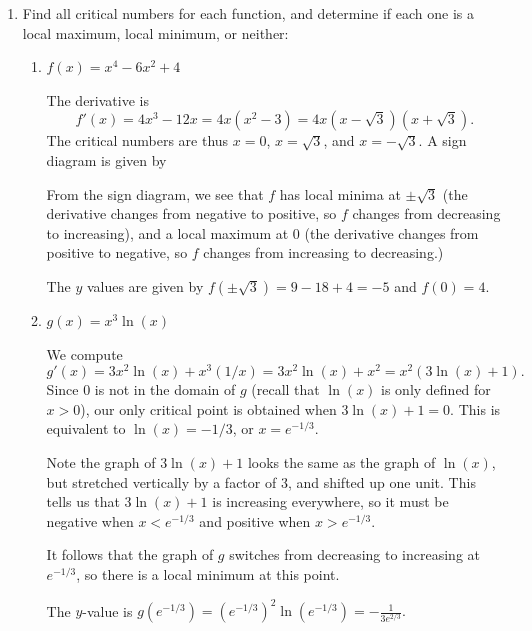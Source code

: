 \documentclass[12pt]{article}
\begin{document}
\begin{enumerate}
\item Find all critical numbers for each function, and determine if each one is a local maximum, local minimum, or neither:
\begin{enumerate}
\item $f(x)=x^4-6x^2+4$

The derivative is
\[
f'(x) = 4x^3-12x=4x(x^2-3)=4x(x-\sqrt{3})(x+\sqrt{3}).
\]
The critical numbers are thus $x=0$, $x=\sqrt{3}$, and $x=-\sqrt{3}$. A sign diagram is given by
\begin{center}
\end{center}
From the sign diagram, we see that $f$ has local minima at $\pm \sqrt{3}$ (the derivative changes from negative to positive, so $f$ changes from decreasing to increasing), and a local maximum at 0 (the derivative changes from positive to negative, so $f$ changes from increasing to decreasing.)

The $y$ values are given by $f(\pm\sqrt{3}) = 9-18+4=-5$ and $f(0)=4$.

\item $g(x) = x^3\ln(x)$

We compute
\[
g'(x) = 3x^2\ln(x)+x^3(1/x) = 3x^2\ln(x)+x^2=x^2(3\ln(x)+1).
\]
Since 0 is not in the domain of $g$ (recall that $\ln(x)$ is only defined for $x>0$), our only critical point is obtained when $3\ln(x)+1=0$. This is equivalent to $\ln(x)=-1/3$, or $x=e^{-1/3}$.

Note the graph of $3\ln(x)+1$ looks the same as the graph of $\ln(x)$, but stretched vertically by a factor of 3, and shifted up one unit. This tells us that $3\ln(x)+1$ is increasing everywhere, so it must be negative when $x<e^{-1/3}$  and positive when $x>e^{-1/3}$.

It follows that the graph of $g$ switches from decreasing to increasing at $e^{-1/3}$, so there is a local minimum at this point.

The $y$-value is $g(e^{-1/3}) = (e^{-1/3})^2\ln(e^{-1/3})=-\frac{1}{3e^{2/3}}.$


\end{enumerate}
\end{enumerate}
\end{document}
